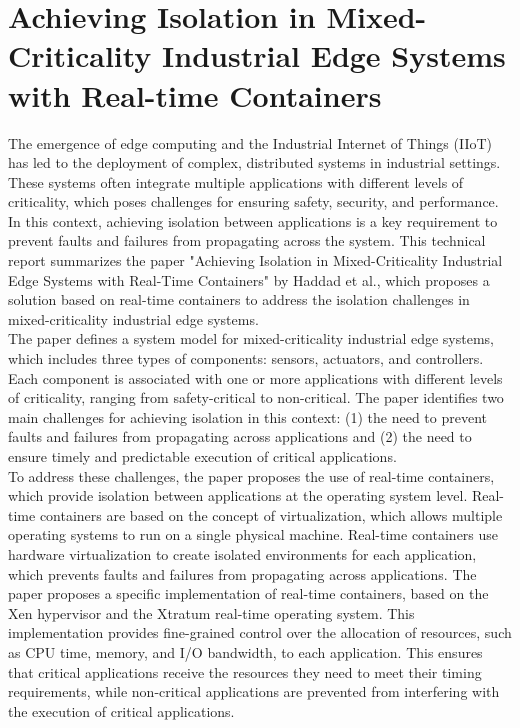\documentclass[a4paper, 10pt]{article}
\theoremstyle{nonumberplain}
\begin{document}
\section{Achieving Isolation in Mixed-Criticality Industrial Edge Systems
with Real-time Containers}
The emergence of edge computing and the Industrial Internet of Things (IIoT) has
led to the deployment of complex, distributed systems in industrial settings.
These systems often integrate multiple applications with different levels of
criticality, which poses challenges for ensuring safety, security, and performance.
In this context, achieving isolation between applications is a key requirement to
prevent faults and failures from propagating across the system. This technical
report summarizes the paper "Achieving Isolation in Mixed-Criticality Industrial
Edge Systems with Real-Time Containers" by Haddad et al., which proposes a
solution based on real-time containers to address the isolation challenges in
mixed-criticality industrial edge systems. \\
The paper defines a system model for mixed-criticality industrial edge systems,
which includes three types of components: sensors, actuators, and controllers.
Each component is associated with one or more applications with different levels
of criticality, ranging from safety-critical to non-critical. The paper identifies two
main challenges for achieving isolation in this context: (1) the need to prevent
faults and failures from propagating across applications and (2) the need to
ensure timely and predictable execution of critical applications. \\
To address these challenges, the paper proposes the use of real-time containers,
which provide isolation between applications at the operating system level. Real-
time containers are based on the concept of virtualization, which allows multiple
operating systems to run on a single physical machine. Real-time containers use
hardware virtualization to create isolated environments for each application,
which prevents faults and failures from propagating across applications.
The paper proposes a specific implementation of real-time containers, based on
the Xen hypervisor and the Xtratum real-time operating system. This
implementation provides fine-grained control over the allocation of resources,
such as CPU time, memory, and I/O bandwidth, to each application. This ensures
that critical applications receive the resources they need to meet their timing
requirements, while non-critical applications are prevented from interfering with
the execution of critical applications. \\
\end{document}
